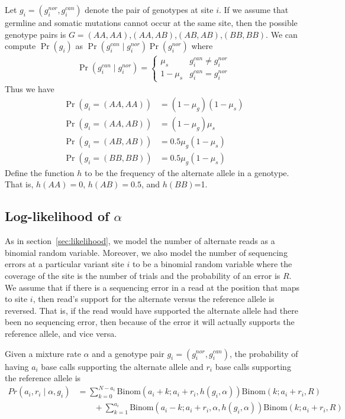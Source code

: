 \documentclass[12pt]{article}
\begin{document}
Let $g_i=(g_i^{nor},g_i^{can})$ denote the pair of genotypes at site
$i$.  If we assume that germline and somatic mutations cannot occur at
the same site, then the possible genotype pairs is $G =
(AA,AA)$,$(AA,AB)$,$(AB,AB)$,$(BB,BB)$.  We can compute $\Pr(g_i)$ as
$\Pr(g_i^{can} \mid g_i^{nor}) \Pr(g_i^{nor})$ where
\begin{align*}
\Pr(g_i^{can} \mid g_i^{nor}) =
\begin{cases}
\mu_s & g_i^{can} \not = g_i^{nor} \\
1 - \mu_s & g_i^{can} = g_i^{nor}
\end{cases}
\end{align*}
Thus we have
\begin{align*}
\Pr(g_i=(AA,AA))&=(1 - \mu_g)(1 - \mu_s) \\
\Pr(g_i=(AA,AB))&=(1 - \mu_g)\mu_s \\
\Pr(g_i=(AB,AB))&=0.5\mu_g(1 - \mu_s) \\
\Pr(g_i=(BB,BB))&=0.5\mu_g(1 - \mu_s)
\end{align*}
Define the function $h$ to be the frequency of the alternate allele in
a genotype.  That is, $h(AA)=0$, $h(AB)=0.5$, and $h(BB)$=1.

\subsection{Log-likelihood of $\alpha$}
As in section~\ref{sec:likelihood}, we model the number of alternate
reads as a binomial random variable.  Moreover, we also model the
number of sequencing errors at a particular variant site $i$ to be a
binomial random variable where the coverage of the site is the number
of trials and the probability of an error is $R$.  We assume that if there is a sequencing error in a read at the position that maps to site $i$, then read's support
for the alternate versus the reference allele is reversed.  That is, if
the read would have supported the alternate allele had there been no
sequencing error, then because of the error it will actually supports the reference allele, and vice versa.

Given a mixture rate $\alpha$ and a genotype pair
$g_i=(g_i^{nor},g_i^{can})$, the probability of having $a_i$ base
calls supporting the alternate allele and $r_i$ base calls supporting
the reference allele is
\begin{align*}
Pr(a_i, r_i \mid \alpha, g_i) &= \sum_{k=0}^{N-a_i} \text{Binom}(a_i + k ; a_i + r_i, h(g_i, \alpha)) \text{Binom}(k ; a_i + r_i, R) \\
& \qquad + \sum_{k=1}^{a_i}\text{Binom}(a_i -k ; a_i + r_i, \alpha, h(g_i, \alpha)) \text{Binom}(k ; a_i + r_i, R)
\end{align*}
\end{document}
